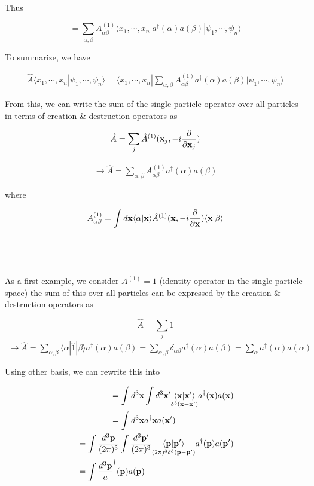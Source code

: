 Thus

\[=\sum_{\alpha,\beta}A_{\alpha\beta}^{(1)}\langle x_1,\cdots,x_n|a^\dagger(\alpha)a(\beta)|\psi_1,\cdots,\psi_n\rangle \]

To summarize, we have

\begin{align}
\hat{A}\langle x_1,\cdots,x_n|\psi_1,\cdots,\psi_n\rangle = \langle x_1,\cdots,x_n|\sum_{\alpha,\beta}A_{\alpha\beta}^{(1)}a^\dagger(\alpha)a(\beta)|\psi_1,\cdots,\psi_n\rangle
\end{align}

From this, we can write the sum of the single-particle operator over all particles in terms of creation \& destruction operators as 

\[\hat{A} = \sum_j\hat{A}^{(1)}({\bf x}_j,-i\frac{\partial}{\partial {\bf x}_j}) \]

\begin{align}\label{eqs1.7.6}
\rightarrow \hat{A} = \sum_{\alpha,\beta} A^{(1)}_{\alpha\beta}a^\dagger(\alpha)a(\beta)
\end{align}

where

\[A^{(1)}_{\alpha\beta} = \int d{\bf x} \langle\alpha|{\bf x}\rangle\hat{A}^{(1)}({\bf x}, -i\frac{\partial}{\partial{\bf x}})\langle{\bf x}|\beta\rangle\]

\hrule
\smallskip
\hrule


\ 

As a first example, we consider $A^{(1)} = 1$ (identity operator in the single-particle space) the sum of this over all particles can be expressed by the creation \& destruction operators as 

\[\hat{A} = \sum_j \hat{1}\]
\begin{align}
\rightarrow\hat{A} = \sum_{\alpha,\beta}\langle\alpha|\hat{1}|\beta\rangle a^\dagger(\alpha)a(\beta) = \sum_{\alpha,\beta}\delta_{\alpha\beta}a^\dagger(\alpha)a(\beta) = \sum_\alpha a^\dagger(\alpha)a(\alpha)
\end{align}

Using other basis, we can rewrite this into

\begin{align}
\begin{split} 
&=\int d^3{\bf x}\int d^3{\bf x'}\underset{\delta^3(\bf x-x')}{\langle\bf x|x'\rangle}a^\dagger({\bf x})a({\bf x})\\
&=\int d^3{\bf x}a^\dagger{\bf x}a({\bf x'})
\end{split}\\
\begin{split}
&=\int \frac{d^3{\bf p}}{(2\pi)^3}\int \frac{d^3\bf p'}{(2\pi)^3}\underset{(2\pi)^3\delta^3(\bf p - p')}{\langle\bf p|p'\rangle}a^\dagger({\bf p})a({\bf p'})\\
&=\int \frac{d^3\bf p}a^\dagger({\bf p})a({\bf p})
\end{split}
\end{align}

